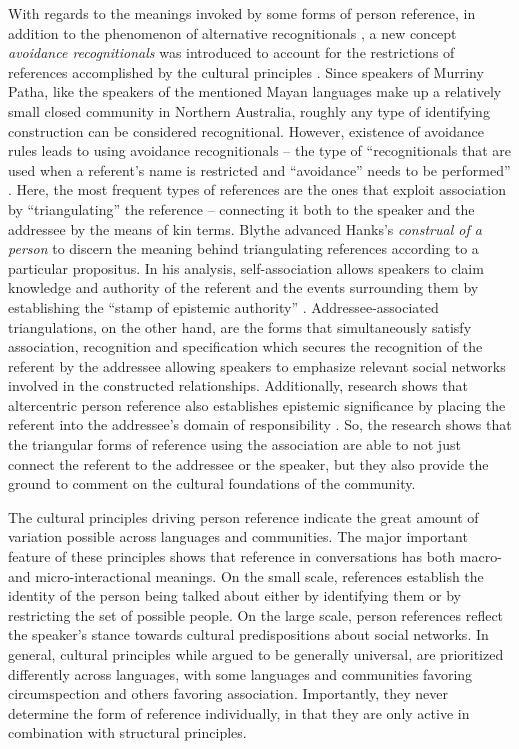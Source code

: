 \documentclass[12pt, draft]{article}
\begin{document}
With regards to the meanings invoked by some forms of person reference, in addition to the phenomenon of alternative recognitionals \parencite{stivers2007}, a new concept \textit{avoidance recognitionals} was introduced to account for the restrictions of references accomplished by the cultural principles \parencite{blythe2009}. Since speakers of Murriny Patha, like the speakers of the mentioned Mayan languages make up a relatively small closed community in Northern Australia, roughly any type of identifying construction can be considered recognitional. However, existence of avoidance rules leads to using avoidance recognitionals -- the type of ``recognitionals that are used when a referent's name is restricted and ``avoidance'' needs to be performed'' \textcite[p. 213]{blythe2009}. Here, the most frequent types of references are the ones that exploit association by ``triangulating'' the reference -- connecting it both to the speaker and the addressee by the means of kin terms. Blythe advanced Hanks's \textit{construal of a person} to discern the meaning behind triangulating references according to a particular propositus. In his analysis, self-association allows speakers to claim knowledge and authority of the referent and the events surrounding them by establishing the ``stamp of epistemic authority'' \parencite[p. 231]{blythe2009}. Addressee-associated triangulations, on the other hand, are the forms that simultaneously satisfy association, recognition and specification which secures the recognition of the referent by the addressee allowing speakers to emphasize relevant social networks involved in the constructed relationships. Additionally, research shows that altercentric person reference also establishes epistemic significance by placing the referent into the addressee's domain of responsibility \parencite{stivers2007}. So, the research shows that the triangular forms of reference using the association are able to not just connect the referent to the addressee or the speaker, but they also provide the ground to comment on the cultural foundations of the community.

The cultural principles driving person reference indicate the great amount of variation possible across languages and communities. The major important feature of these principles shows that reference in conversations has both macro- and micro-interactional meanings. On the small scale, references establish the identity of the person being talked about either by identifying them or by restricting the set of possible people. On the large scale, person references reflect the speaker's stance towards cultural predispositions about social networks. In general, cultural principles while argued to be generally universal, are prioritized differently across languages, with some languages and communities favoring circumspection and others favoring association. Importantly, they never determine the form of reference individually, in that they are only active in combination with structural principles.
\end{document}
